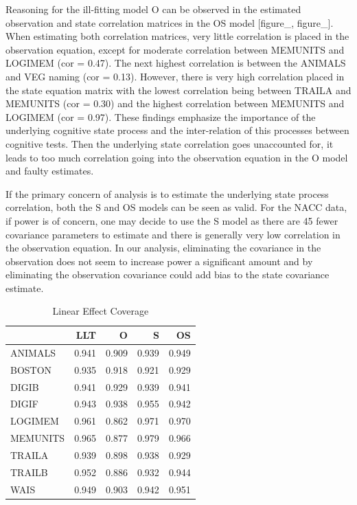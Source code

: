 \documentclass[
]{article}
\begin{document}
Reasoning for the ill-fitting model O can be observed in the estimated observation and state correlation matrices in the OS model {[}figure\_, figure\_{]}. When estimating both correlation matrices, very little correlation is placed in the observation equation, except for moderate correlation between MEMUNITS and LOGIMEM (cor = 0.47). The next highest correlation is between the ANIMALS and VEG naming (cor = 0.13). However, there is very high correlation placed in the state equation matrix with the lowest correlation being between TRAILA and MEMUNITS (cor = 0.30) and the highest correlation between MEMUNITS and LOGIMEM (cor = 0.97). These findings emphasize the importance of the underlying cognitive state process and the inter-relation of this processes between cognitive tests. Then the underlying state correlation goes unaccounted for, it leads to too much correlation going into the observation equation in the O model and faulty estimates.

If the primary concern of analysis is to estimate the underlying state process correlation, both the S and OS models can be seen as valid. For the NACC data, if power is of concern, one may decide to use the S model as there are 45 fewer covariance parameters to estimate and there is generally very low correlation in the observation equation. In our analysis, eliminating the covariance in the observation does not seem to increase power a significant amount and by eliminating the observation covariance could add bias to the state covariance estimate.

\begin{longtable}[t]{l|r|r|r|r}
\caption{\label{tab:unnamed-chunk-2}Linear Effect Coverage}\\
\hline
  & LLT & O & S & OS\\
\hline
ANIMALS & 0.941 & 0.909 & 0.939 & 0.949\\
\hline
BOSTON & 0.935 & 0.918 & 0.921 & 0.929\\
\hline
DIGIB & 0.941 & 0.929 & 0.939 & 0.941\\
\hline
DIGIF & 0.943 & 0.938 & 0.955 & 0.942\\
\hline
LOGIMEM & 0.961 & 0.862 & 0.971 & 0.970\\
\hline
MEMUNITS & 0.965 & 0.877 & 0.979 & 0.966\\
\hline
TRAILA & 0.939 & 0.898 & 0.938 & 0.929\\
\hline
TRAILB & 0.952 & 0.886 & 0.932 & 0.944\\
\hline
WAIS & 0.949 & 0.903 & 0.942 & 0.951\\
\hline
\end{longtable}
\end{document}
